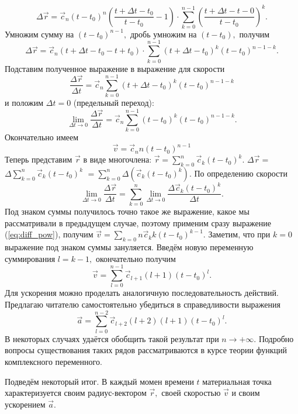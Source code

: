 \documentclass[a5paper,11pt]{article}
\begin{document}
$$\Delta \vec{r} = \vec{c}_n (t-t_0)^n\left(\frac{t+\Delta t-t_0}{t-t_0} - 1\right)\cdot 
				\sum\limits_{k=0}^{n-1}\left(\frac{t+\Delta t-t-0}{t-t_0}\right)^k.$$
Умножим сумму на $(t-t_0)^{n-1},$ дробь умножим на $(t-t_0),$ получим
$$\Delta \vec{r} = \vec{c}_n \left(t+\Delta t-t_0-t+t_0\right)\cdot 
				\sum\limits_{k=0}^{n-1}\left(t+\Delta t-t_0\right)^k\left(t-t_0\right)^{n-1-k}.$$
Подставим полученное выражение в выражение для скорости
$$\frac{\Delta \vec{r}}{\Delta t} = \vec{c}_n  
				\sum\limits_{k=0}^{n-1}\left(t+\Delta t-t_0\right)^k\left(t-t_0\right)^{n-1-k}$$
и положим $\Delta t = 0$ (предельный переход):
$$\lim\limits_{\Delta t \to 0}\frac{\Delta \vec{r}}{\Delta t} = \vec{c}_n  
				\sum\limits_{k=0}^{n-1}\left(t-t_0\right)^k\left(t-t_0\right)^{n-1-k}.$$
Окончательно имеем
\begin{equation}
\vec{v} = \vec{c}_n n(t-t_0)^{n-1}
\label{eq:diff_pow}
\end{equation}
Теперь представим $\vec{r}$ в виде многочлена: $\vec{r} = \sum\limits_{k=0}^{n}\vec{c}_k(t-t_0)^k.$
$\Delta \vec{r} =$ $
\Delta\sum\limits_{k=0}^{n}\vec{c}_k(t-t_0)^k$
$= \sum\limits_{k=0}^{n}\Delta\left(\vec{c}_k(t-t_0)^k\right).$
По определению скорости
$$\lim\limits_{\Delta t \to 0}\frac{\Delta \vec{r}}{\Delta t} 
= \sum\limits_{k=0}^{n}\lim\limits_{\Delta t \to 0}\frac{\Delta\vec{c}_k(t-t_0)^k}{\Delta t}.$$
Под знаком суммы получилось точно такое же выражение, какое мы рассматривали в предыдущем случае,
поэтому применим сразу выражение (\ref{eq:diff_pow}), получим
$\vec{v} = \sum\limits_{k=0}{n}\vec{c}_k k(t-t_0)^{k-1}.$
Заметим, что при $k=0$ выражение под
знаком суммы зануляется. Введём новую переменную суммирования $l=k-1,$ окончательно получим
\begin{equation}
\vec{v} = \sum\limits_{l=0}^{n-1}\vec{c}_{l+1}(l+1)(t-t_0)^{l}.
\label{eq:teilor_speed}
\end{equation}
Для ускорения можно проделать аналогичную последовательность действий. Предлагаю
читателю самостоятельно убедиться в справедливости выражения
\begin{equation}
\vec{a} = \sum\limits_{l=0}^{n-2}\vec{c}_{l+2}(l+2)(l+1)(t-t_0)^{l}.
\label{eq:teilor_accel}
\end{equation}
В некоторых случаях удаётся обобщить такой результат при $n \to +\infty.$ Подробно вопросы
существования таких рядов рассматриваются в курсе теории функций комплексного переменного.
\par
Подведём некоторый итог. В каждый момен времени $t$ материальная точка характеризуется
своим радиус-вектором $\vec{r},$ своей скоростью $\vec{v}$ и своим ускорением $\vec{a}.$
\end{document}
